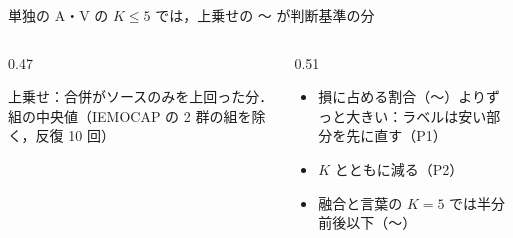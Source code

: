 \begin{frame}{単独の A・V の $K\le5$ では，上乗せの 〜 が判断基準の分}
\begin{columns}[T,onlytextwidth]
\begin{column}{0.47\textwidth}
      {\raggedright\tiny 上乗せ：合併がソースのみを上回った分．組の中央値（IEMOCAP の 2 群の組を除く，反復 10 回）\par}
    \end{column}
    \begin{column}{0.51\textwidth}
      \begin{itemize}\footnotesize\setlength{\itemsep}{10pt}
        \item 損に占める割合（〜）よりずっと大きい：ラベルは安い部分を先に直す（P1）
        \item $K$ とともに減る（P2）
        \item 融合と言葉の $K=5$ では半分前後以下（〜）
      \end{itemize}
    \end{column}
  \end{columns}
\end{frame}

